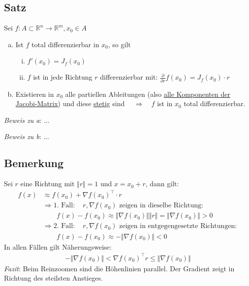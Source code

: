 \documentclass[11pt,a4paper]{book}
\newcommand {\Rn}	{\mathbb{R}^n}
\newcommand {\Rm}	{\mathbb{R}^m}
\newcommand{\1}    	{\mathbbm{1}}
\begin{document}
\subsection{Satz}
Sei \(f : A \subset \Rn \rightarrow \Rm, x_0 \in A\)
\begin{enumerate}[a.~]
	\item Ist \(f\) total differenzierbar in \(x_0\), so gilt
	\begin{enumerate}[(i)]
		\item \(f'(x_0) = J_f(x_0) \)
		\item \(f\) ist in jede Richtung \(r\) differenzierbar mit: \( \frac{\partial}{\partial r} f(x_0) = J_f(x_0) \cdot r \)
	\end{enumerate}
	\item Existieren in \(x_0\) alle partiellen Ableitungen (also \underline{alle Komponenten der Jacobi-Matrix}) und diese \underline{stetig} sind \(\quad \Rightarrow \quad f\) ist in \(x_0\) total differenzierbar.
\end{enumerate}

\noindent
\textit{Beweis zu a}: ...

\noindent
\textit{Beweis zu b}: ...

\subsection{Bemerkung}
Sei \(r\) eine Richtung mit \(\Vert r \Vert = 1\) und \(x = x_0 + r\), dann gilt:
\begin{align*}
	f(x) &\approx f(x_0) + \nabla f(x_0)^\top \cdot r \\
	&\Rightarrow \textrm{1. Fall}: \quad r, \nabla f(x_0) \textrm{ zeigen in dieselbe Richtung}: \\
	&\qquad f(x) - f(x_0) \approx \Vert \nabla f(x_0) \Vert \Vert r \Vert = \Vert \nabla f(x_0) \Vert > 0 \\
	&\Rightarrow \textrm{2. Fall}: \quad r, \nabla f(x_0) \textrm{ zeigen in entgegengesetzte Richtungen}: \\
	&\qquad f(x) - f(x_0) \approx - \Vert \nabla f(x_0) \Vert < 0
\end{align*}
In allen Fällen gilt Näherungsweise:
\begin{align*}
	- \Vert \nabla f(x_0) \Vert  < \nabla f(x_0)^\top r \leqslant \Vert \nabla f(x_0) \Vert
\end{align*}
\textit{Fazit}: Beim Reinzoomen sind die Höhenlinien parallel. Der Gradient zeigt in Richtung des steilsten Anstieges.
\end{document}
